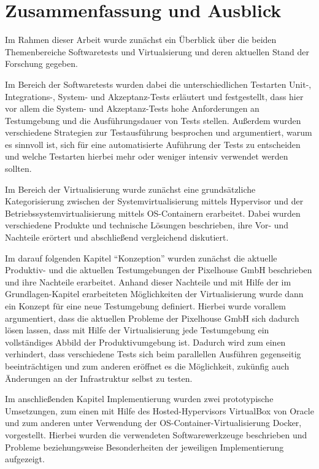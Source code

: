 \section{Zusammenfassung und Ausblick}

Im Rahmen dieser Arbeit wurde zunächst ein Überblick über die beiden Themenbereiche Softwaretests und Virtualsierung und deren aktuellen Stand der Forschung gegeben.

Im Bereich der Softwaretests wurden dabei die unterschiedlichen Testarten Unit-, Integrations-, System- und Akzeptanz-Tests erläutert und festgestellt, dass hier vor allem die System- und Akzeptanz-Tests hohe Anforderungen an Testumgebung und die Ausführungsdauer von Tests stellen. Außerdem wurden verschiedene Strategien zur Testausführung besprochen und argumentiert, warum es sinnvoll ist, sich für eine automatisierte Auführung der Tests zu entscheiden und welche Testarten hierbei mehr oder weniger intensiv verwendet werden sollten.

Im Bereich der Virtualisierung wurde zunächst eine grundsätzliche Kategorisierung zwischen der Systemvirtualisierung mittels Hypervisor und der Betriebssystemvirtualisierung mittels OS-Containern
erarbeitet. Dabei wurden verschiedene Produkte und technische Lösungen beschrieben, ihre Vor- und Nachteile erörtert und abschließend vergleichend diskutiert.

Im darauf folgenden Kapitel "`Konzeption"' wurden zunächst die aktuelle Produktiv- und die aktuellen Testumgebungen der Pixelhouse GmbH beschrieben und ihre Nachteile erarbeitet. Anhand dieser Nachteile und mit Hilfe der im Grundlagen-Kapitel erarbeiteten Möglichkeiten der Virtualisierung wurde dann ein Konzept für eine neue Testumgebung definiert. Hierbei wurde vorallem argumentiert, dass die aktuellen Probleme der Pixelhouse GmbH sich dadurch lösen lassen, dass mit Hilfe der Virtualisierung jede Testumgebung ein vollständiges Abbild der Produktivumgebung ist. Dadurch wird zum einen verhindert, dass verschiedene Tests sich beim parallellen Ausführen gegenseitig beeinträchtigen und zum anderen eröffnet es die Möglichkeit, zukünfig auch Änderungen an der Infrastruktur selbst zu testen.

Im anschließenden Kapitel Implementierung wurden zwei prototypische Umsetzungen, zum einen mit Hilfe des Hosted-Hypervisors VirtualBox von Oracle und zum anderen unter Verwendung der OS-Container-Virtualisierung Docker, vorgestellt. Hierbei wurden die verwendeten Softwarewerkzeuge beschrieben und Probleme beziehungsweise Besonderheiten der jeweiligen Implementierung aufgezeigt.

